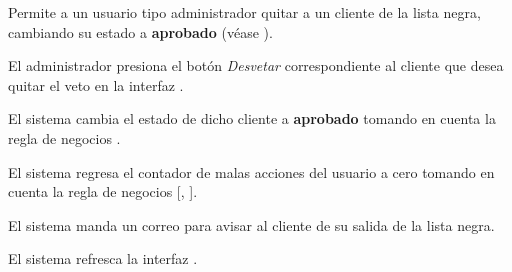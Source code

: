 %
%

{
  Permite a un usuario tipo administrador quitar a un cliente de la lista negra,
  cambiando su estado a \textbf{aprobado} (véase
  ).

  \begin{trayectoriaPrincipal}

    \item El administrador presiona el botón \textit{Desvetar}
      correspondiente al cliente que desea quitar el veto en la interfaz
      .

    \item El sistema cambia el estado de dicho cliente a \textbf{aprobado}
      tomando en cuenta la regla de negocios .

    \item El sistema regresa el contador de malas acciones del usuario a cero
      tomando en cuenta la regla de negocios [,
      ].

    \item El sistema manda un correo para avisar al cliente de su
      salida de la lista negra.

    \item El sistema refresca la interfaz .

  \end{trayectoriaPrincipal}
}
